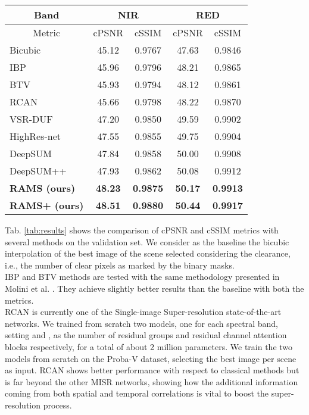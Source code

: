 \documentclass[journal]{IEEEtran}
\begin{document}
\begin{table*}[]
\centering
\begin{tabular}{l|cc|cc}
\multicolumn{1}{c|}{Band}   & \multicolumn{2}{c|}{NIR} & \multicolumn{2}{c}{RED} \\ \hline
\multicolumn{1}{c|}{Metric} & cPSNR       & cSSIM      & cPSNR      & cSSIM      \\ \hline\hline
Bicubic                     & 45.12       & 0.9767     & 47.63      & 0.9846     \\
IBP\cite{irani1991improving}& 45.96       & 0.9796     & 48.21      & 0.9865     \\
BTV\cite{farsiu2004fast}    & 45.93       & 0.9794     & 48.12      & 0.9861     \\
RCAN\cite{zhang2018image}   & 45.66       & 0.9798     & 48.22      & 0.9870     \\
VSR-DUF\cite{jo2018deep}    & 47.20       & 0.9850     & 49.59      & 0.9902     \\
HighRes-net\cite{deudon2020highres} & 47.55       & 0.9855     & 49.75      & 0.9904     \\
DeepSUM\cite{molini2019deepsum}    & 47.84       & 0.9858     & 50.00      & 0.9908     \\
DeepSUM++\cite{molini2020deepsum++} & 47.93       & 0.9862     & 50.08      & 0.9912     \\
\textbf{RAMS (ours)}        &\textbf{48.23} &\textbf{0.9875} &\textbf{50.17} &\textbf{0.9913} \\
\textbf{RAMS+ (ours)}&\textbf{48.51} &\textbf{0.9880} &\textbf{50.44} &\textbf{0.9917}
\end{tabular}
\caption{Average cPSNR (dB) and cSSIM over the validation dataset for different methods.}
\label{tab:results}
\end{table*}

Tab. \ref{tab:results} shows the comparison of cPSNR and cSSIM metrics with several methods on the validation set. We consider as the baseline the bicubic interpolation of the best image of the scene selected considering the clearance, i.e., the number of clear pixels as marked by the binary masks.\\
IBP\cite{irani1991improving} and BTV\cite{farsiu2004fast} methods are tested with the same methodology presented in Molini et al. \cite{molini2019deepsum}. They achieve slightly better results than the baseline with both the metrics.\\
RCAN \cite{zhang2018image} is currently one of the Single-image Super-resolution state-of-the-art networks. We trained from scratch two models, one for each spectral band, setting  and , as the number of residual groups and residual channel attention blocks respectively, for a total of about 2 million parameters. We train the two models from scratch on the Proba-V dataset, selecting the best image per scene as input. RCAN shows better performance with respect to classical methods but is far beyond the other MISR networks, showing how the additional information coming from both spatial and temporal correlations is vital to boost the super-resolution process.
\end{document}
